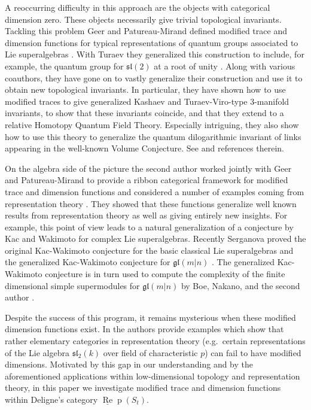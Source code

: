 \documentclass[12pt, reqno]{amsart}
\theoremstyle{definition}
\def\uRep{\underline{\operatorname{Re}}\!\operatorname{p}}
\renewcommand{\1}{_{(1)}}
\renewcommand{\2}{_{(2)}}
\newcommand{\3}{_{(3)}}
\newcommand{\4}{_{(4)}}
\begin{document}
A reoccurring difficulty in this approach are the objects with categorical dimension zero.  These objects necessarily give trivial topological invariants.  Tackling this problem Geer and Patureau-Mirand defined modified trace and dimension functions for typical representations of quantum groups associated to Lie superalgebras \cite{GP}.  With Turaev they generalized this construction to include, for example, the quantum group for $\mathfrak{sl}(2)$ at a root of unity \cite{GPT}.  Along with various coauthors, they have gone on to vastly generalize their construction and use it to obtain new topological invariants.  In particular, they have shown how to use modified traces to give generalized Kashaev and Turaev-Viro-type 3-manifold invariants, to show that these invariants coincide, and that they extend to a relative Homotopy Quantum Field Theory.  Especially intriguing, they also show how to use this theory to generalize the quantum dilogarithmic invariant of links appearing in the well-known Volume Conjecture.  See \cite{GP2, GKT} and references therein.  

On the algebra side of the picture the second author worked jointly with Geer and Patureau-Mirand to provide a ribbon categorical framework for modified trace and dimension functions and considered a number of examples coming from representation theory \cite{GKP}.   They showed that these functions generalize well known results from representation theory as well as giving entirely new insights.  For example, this point of view leads to a natural generalization of a conjecture  by Kac and Wakimoto for complex Lie superalgebras.   Recently Serganova proved the original Kac-Wakimoto conjecture for the basic classical Lie superalgebras and the generalized Kac-Wakimoto conjecture for $\mathfrak{gl}(m|n)$ \cite{Ser}.  The generalized Kac-Wakimoto conjecture is in turn used to compute the complexity of the finite dimensional simple supermodules for $\mathfrak{gl}(m|n)$ by Boe, Nakano, and the second author \cite{BKN4}.

Despite the success of this program, it remains mysterious when these modified dimension functions exist.  In \cite{GKP} the authors provide examples which show that rather elementary categories in representation theory (e.g.\ certain representations of the Lie algebra $\mathfrak{sl}_{2}(k)$ over field of characteristic $p$) can fail to have modified dimensions.   Motivated by this gap in our understanding and by the aforementioned applications within low-dimensional topology and representation theory, in this paper we investigate modified trace and dimension functions within Deligne's category $\uRep (S_{t})$.  
\end{document}
